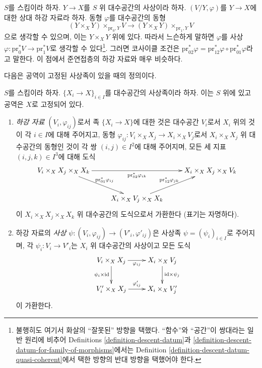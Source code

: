 \begin{remark}
\label{remark-easier}
$S$를 스킴이라 하자. $Y\to X$를 $S$ 위 대수공간의 사상이라 하자.
$(V/Y,\varphi)$를 $Y\to X$에 대한 상대 하강 자료라 하자. 동형
$\varphi$를 대수공간의 동형
$$
(Y \times_X Y) \times_{\text{pr}_0, Y} V
\longrightarrow
(Y \times_X Y) \times_{\text{pr}_1, Y} V
$$
으로 생각할 수 있으며, 이는 $Y\times_XY$ 위에 있다. 따라서 느슨하게 말하면 $\varphi$를 사상
$\varphi:\text{pr}_0^*V\to\text{pr}_1^*V$로 생각할 수 있다\footnote{불행히도
여기서 화살의 ``잘못된'' 방향을 택했다. ``함수''와 ``공간''이 쌍대라는
일반 원리에 비추어 Definitions \ref{definition-descent-datum}과
\ref{definition-descent-datum-for-family-of-morphisms}에서는 Definition
\ref{definition-descent-datum-quasi-coherent}에서 택한 방향의 반대 방향을
택했어야 한다.}. 그러면 코사이클 조건은
$\text{pr}_{02}^*\varphi=\text{pr}_{12}^*\varphi\circ
\text{pr}_{01}^*\varphi$라고 말한다. 이 점에서 준연접층의 하강 자료와
매우 비슷하다.
\end{remark}

\noindent
다음은 공역이 고정된 사상족이 있을 때의 정의이다.

\begin{definition}
\label{definition-descent-datum-for-family-of-morphisms}
$S$를 스킴이라 하자. $\{X_i\to X\}_{i\in I}$를 대수공간의 사상족이라
하자. 이는 $S$ 위에 있고 공역은 $X$로 고정되어 있다.
\begin{enumerate}
\item {\it 하강 자료 $(V_i,\varphi_{ij})$}로서 족 $\{X_i\to X\}$에
대한 것은 대수공간 $V_i$로서 $X_i$ 위의 것이 각 $i\in I$에 대해
주어지고, 동형 $\varphi_{ij}:V_i\times_XX_j\to X_i\times_XV_j$로서
$X_i\times_XX_j$ 위 대수공간의 동형인 것이 각 쌍 $(i,j)\in I^2$에
대해 주어지며, 모든 세
지표 $(i,j,k)\in I^3$에 대해 도식
$$
\xymatrix{
V_i \times_X X_j \times_X X_k
\ar[rd]^{\text{pr}_{01}^*\varphi_{ij}}
\ar[rr]_{\text{pr}_{02}^*\varphi_{ik}} &
&
X_i \times_X X_j \times_X V_k\\
&
X_i \times_X V_j \times_X X_k
\ar[ru]^{\text{pr}_{12}^*\varphi_{jk}}
}
$$
이 $X_i\times_XX_j\times_XX_k$ 위 대수공간의 도식으로서 가환한다
(표기는 자명하다).
\item 하강 자료의 {\it 사상
$\psi:(V_i,\varphi_{ij})\to(V'_i,\varphi'_{ij})$}은 사상족
$\psi=(\psi_i)_{i\in I}$로 주어지며, 각 $\psi_i:V_i\to V'_i$는
$X_i$ 위 대수공간의 사상이고 모든
도식
$$
\xymatrix{
V_i \times_X X_j \ar[r]_{\varphi_{ij}} \ar[d]_{\psi_i \times \text{id}} &
X_i \times_X V_j \ar[d]^{\text{id} \times \psi_j} \\
V'_i \times_X X_j \ar[r]^{\varphi'_{ij}} & X_i \times_X V'_j
}
$$
이 가환한다.
\end{enumerate}
\end{definition}

